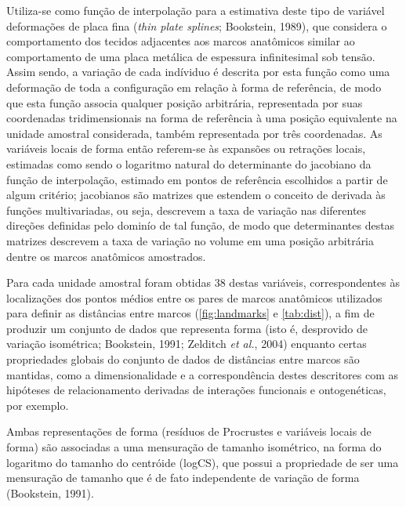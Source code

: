 \documentclass[12pt,twoside]{report}
\begin{document}
Utiliza-se como função de interpolação para a estimativa deste tipo de
variável deformações de placa fina (\emph{thin plate splines};
Bookstein, 1989), que considera o comportamento dos tecidos adjacentes
aos marcos anatômicos similar ao comportamento de uma placa metálica de
espessura infinitesimal sob tensão. Assim sendo, a variação de cada
indíviduo é descrita por esta função como uma deformação de toda a
configuração em relação à forma de referência, de modo que esta função
associa qualquer posição arbitrária, representada por suas coordenadas
tridimensionais na forma de referência à uma posição equivalente na
unidade amostral considerada, também representada por três coordenadas.
As variáveis locais de forma então referem-se às expansões ou retrações
locais, estimadas como sendo o logaritmo natural do determinante do
jacobiano da função de interpolação, estimado em pontos de referência
escolhidos a partir de algum critério; jacobianos são matrizes que
estendem o conceito de derivada às funções multivariadas, ou seja,
descrevem a taxa de variação nas diferentes direções definidas pelo
dominío de tal função, de modo que determinantes destas matrizes
descrevem a taxa de variação no volume em uma posição arbitrária dentre
os marcos anatômicos amostrados.

Para cada unidade amostral foram obtidas 38 destas variáveis,
correspondentes às localizações dos pontos médios entre os pares de
marcos anatômicos utilizados para definir as distâncias entre marcos
(\autoref{fig:landmarks} e \autoref{tab:dist}), a fim de produzir um
conjunto de dados que representa forma (isto é, desprovido de variação
isométrica; Bookstein, 1991; Zelditch \emph{et al.}, 2004) enquanto
certas propriedades globais do conjunto de dados de distâncias entre
marcos são mantidas, como a dimensionalidade e a correspondência destes
descritores com as hipóteses de relacionamento derivadas de interações
funcionais e ontogenéticas, por exemplo.



Ambas representações de forma (resíduos de Procrustes e variáveis locais
de forma) são associadas a uma mensuração de tamanho isométrico, na
forma do logaritmo do tamanho do centróide (logCS), que possui a
propriedade de ser uma mensuração de tamanho que é de fato independente
de variação de forma (Bookstein, 1991).
\end{document}
